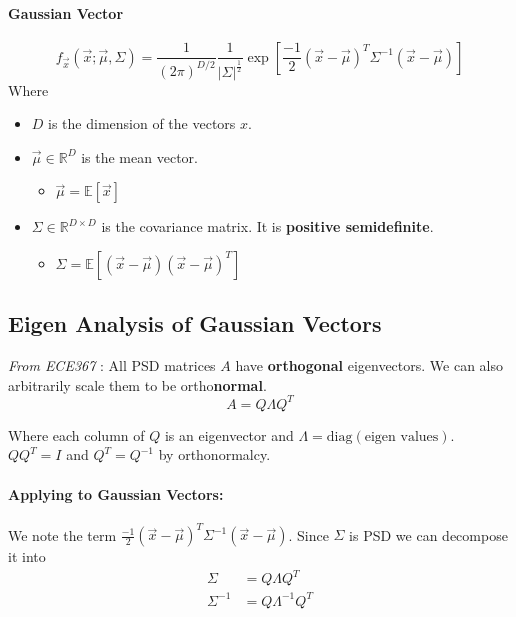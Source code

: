 \documentclass[a4paper,12pt]{report}
\begin{document}
\paragraph{Gaussian Vector} 
\begin{equation}
f_{\vec x}(\vec x; \vec \mu, \Sigma) = \frac{1}{(2\pi)^{D/2}} \frac{1}{|\Sigma|^{\frac{1}{2}}} \exp [\frac{-1}{2} (\vec x - \vec \mu)^T \Sigma^{-1} (\vec x - \vec \mu)]
\end{equation}
Where 
\begin{itemize}
\item $D$ is the dimension of the vectors $x$.
\item $\vec \mu\in \mathbb R^D$ is the mean vector.
\begin{itemize}
\item $\vec \mu = \mathbb E[\vec x]$
\end{itemize}

\item $\Sigma \in \mathbb R^{D\times D}$ is the covariance matrix. It is \textbf{positive semidefinite}.
\begin{itemize}
\item $\Sigma = \mathbb E [(\vec x - \vec \mu)(\vec x - \vec \mu)^T]$
\end{itemize}


\end{itemize}

\subsection{Eigen Analysis of Gaussian Vectors}

\textit{From ECE367} : All PSD matrices $A$ have \textbf{orthogonal} eigenvectors. We can also arbitrarily scale them to be ortho\textbf{normal}. 
\begin{equation}
A = Q\Lambda Q^T
\end{equation}

Where each column of $Q$ is an eigenvector and $\Lambda = \text{diag}(\text{eigen values})$. $QQ^T = I$ and $Q^T = Q^{-1}$ by orthonormalcy. 

\paragraph{Applying to Gaussian Vectors: } 
We note the term $\frac{-1}{2} (\vec x - \vec \mu)^T \Sigma^{-1} (\vec x - \vec \mu)$. Since $\Sigma$ is PSD we can decompose it into 
\begin{equation}
\begin{split}
\Sigma &= Q \Lambda Q^T \\
\Sigma^{-1} &= Q \Lambda^{-1} Q^T \\
\end{split}
\end{equation}
\end{document}
